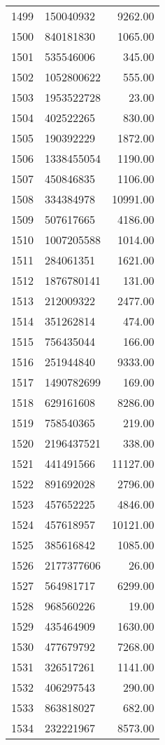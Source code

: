\begin{table}[ht]
\begin{tabular}{rlr}
  1499 & 150040932 & 9262.00 \\ 
  1500 & 840181830 & 1065.00 \\ 
  1501 & 535546006 & 345.00 \\ 
  1502 & 1052800622 & 555.00 \\ 
  1503 & 1953522728 & 23.00 \\ 
  1504 & 402522265 & 830.00 \\ 
  1505 & 190392229 & 1872.00 \\ 
  1506 & 1338455054 & 1190.00 \\ 
  1507 & 450846835 & 1106.00 \\ 
  1508 & 334384978 & 10991.00 \\ 
  1509 & 507617665 & 4186.00 \\ 
  1510 & 1007205588 & 1014.00 \\ 
  1511 & 284061351 & 1621.00 \\ 
  1512 & 1876780141 & 131.00 \\ 
  1513 & 212009322 & 2477.00 \\ 
  1514 & 351262814 & 474.00 \\ 
  1515 & 756435044 & 166.00 \\ 
  1516 & 251944840 & 9333.00 \\ 
  1517 & 1490782699 & 169.00 \\ 
  1518 & 629161608 & 8286.00 \\ 
  1519 & 758540365 & 219.00 \\ 
  1520 & 2196437521 & 338.00 \\ 
  1521 & 441491566 & 11127.00 \\ 
  1522 & 891692028 & 2796.00 \\ 
  1523 & 457652225 & 4846.00 \\ 
  1524 & 457618957 & 10121.00 \\ 
  1525 & 385616842 & 1085.00 \\ 
  1526 & 2177377606 & 26.00 \\ 
  1527 & 564981717 & 6299.00 \\ 
  1528 & 968560226 & 19.00 \\ 
  1529 & 435464909 & 1630.00 \\ 
  1530 & 477679792 & 7268.00 \\ 
  1531 & 326517261 & 1141.00 \\ 
  1532 & 406297543 & 290.00 \\ 
  1533 & 863818027 & 682.00 \\ 
  1534 & 232221967 & 8573.00 \\ 

\end{tabular}
\end{table}
